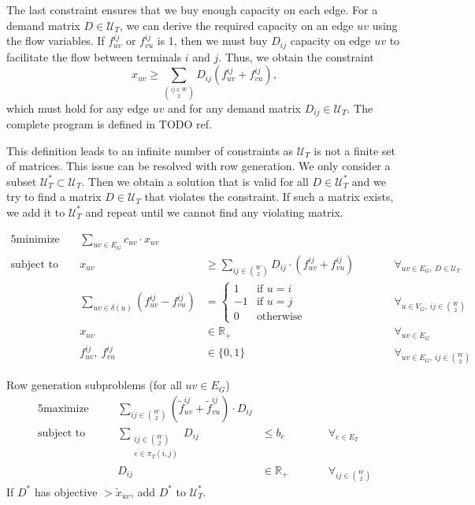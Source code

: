 The last constraint ensures that we buy enough capacity on each edge.
For a demand matrix $D \in \mathcal U_T$, we can derive the required capacity on an edge $uv$ using the flow variables.
If $f^{ij}_{uv}$ or $f^{ij}_{vu}$ is 1, then we must buy $D_{ij}$ capacity on edge $uv$ to facilitate the flow between terminals $i$ and $j$.
Thus, we obtain the constraint
\[
    x_{uv} \ge \sum_{ij \in W \choose 2} D_{ij} ( f^{ij}_{uv} + f^{ij}_{vu}),
\]
which must hold for any edge $uv$ and for any demand matrix $D_{ij} \in \mathcal U_T$.
The complete program is defined in TODO ref. %

This definition leads to an infinite number of constraints as $\mathcal U_T$ is not a finite set of matrices.
This issue can be resolved with row generation.
We only consider a subset $\mathcal U_T^* \subset \mathcal U_T$.
Then we obtain a solution that is valid for all $D \in \mathcal U_T^*$ and we try to find a matrix $D \in \mathcal U_T$ that violates the constraint.
If such a matrix exists, we add it to $\mathcal U_T^*$ and repeat until we cannot find any violating matrix.



\begin{alignat*}{5}
    \text{minimize}\ && \sum_{uv \in E_G} c_{uv} \cdot x_{uv} &&& \\
    \text{subject to}\ && x_{uv} &\ge \sum_{ij \in \binom{W}{2}} D_{ij} \cdot (f_{uv}^{ij} + f_{vu}^{ij}) &&\qquad \forall_{uv \in E_G,\ D \in \mathcal U_T} \\
    && \sum_{uv \in \delta(u)} (f_{uv}^{ij} - f_{vu}^{ij}) &= \begin{cases}
                                                                1 & \text{if $u = i$} \\
                                                                -1 & \text{if $u = j$} \\
                                                                0 & \text{otherwise}
    \end{cases} &&\qquad \forall_{u \in V_G,\ ij \in \binom{W}{2}} \\
    && x_{uv} &\in \mathbb{R}_+ &&\qquad \forall_{uv \in E_G} \\
    && f_{uv}^{ij},\ f_{vu}^{ij} &\in \{ 0, 1 \} &&\qquad \forall_{uv \in E_G,\ ij \in \binom{W}{2}}
\end{alignat*}%


Row generation subproblems (for all $uv \in E_G$)
            \begin{alignat*}{5}
                \text{maximize}\quad && \sum_{ij \in \binom{W}{2}} (\tilde f_{uv}^{ij} + \tilde f_{vu}^{ij}) \cdot D_{ij} &&& \\
                \text{subject to}\quad && \sum_{\substack{ij \in \binom{W}{2}\\e \in \pi_T(i,j)}} D_{ij} &\le b_e &&\qquad \forall_{e \in E_T} \\
                && D_{ij} &\in \mathbb{R}_+ &&\qquad \forall_{ij \in \binom{W}{2}}
            \end{alignat*}
            If $D^*$ has objective $> \tilde x_{uv}$, add $D^*$ to $\mathcal U_T^*$.

